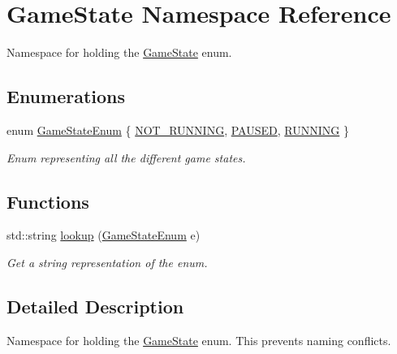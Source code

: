 \hypertarget{namespaceGameState}{
\section{GameState Namespace Reference}
\label{namespaceGameState}
}


Namespace for holding the \hyperlink{namespaceGameState}{GameState} enum.  


\subsection*{Enumerations}
\begin{DoxyCompactItemize}
\item 
enum \hyperlink{namespaceGameState_a1026e99904938017415f188e2daba514}{GameStateEnum} \{ \hyperlink{namespaceGameState_a1026e99904938017415f188e2daba514a7369a7c6b06bc6ffeb86c46f4a7ada84}{NOT\_\-RUNNING}, 
\hyperlink{namespaceGameState_a1026e99904938017415f188e2daba514a54034199811c2d63f502ec17d7e0fd66}{PAUSED}, 
\hyperlink{namespaceGameState_a1026e99904938017415f188e2daba514acfe9f931894d4b40758abf8a52041af6}{RUNNING}
 \}
\begin{DoxyCompactList}\small\item\em Enum representing all the different game states. \item\end{DoxyCompactList}\end{DoxyCompactItemize}
\subsection*{Functions}
\begin{DoxyCompactItemize}
\item 
std::string \hyperlink{namespaceGameState_a8aa26c246b22ee79084d7596502dc824}{lookup} (\hyperlink{namespaceGameState_a1026e99904938017415f188e2daba514}{GameStateEnum} e)
\begin{DoxyCompactList}\small\item\em Get a string representation of the enum. \item\end{DoxyCompactList}\end{DoxyCompactItemize}


\subsection{Detailed Description}
Namespace for holding the \hyperlink{namespaceGameState}{GameState} enum. This prevents naming conflicts. 

